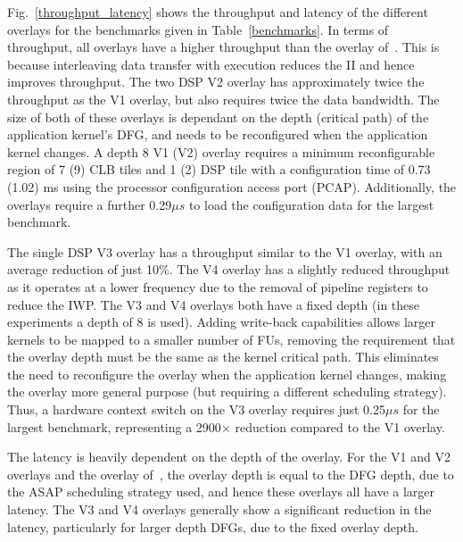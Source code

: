 




Fig.~\ref{throughput_latency} shows the throughput and latency of the different overlays for the benchmarks given in Table~\ref{benchmarks}. 
In terms of throughput, all overlays have a higher throughput than the overlay of~\cite{li2016area}. This is because interleaving data transfer with execution reduces the II and hence improves throughput.
The two DSP V2 overlay has approximately twice the throughput as the V1 overlay, but also requires twice the data bandwidth. The size of both of these overlays is dependant on the depth (critical path) of the application kernel's DFG, and needs to be reconfigured when the application kernel changes.
A depth 8 V1 (V2) overlay requires a minimum reconfigurable region of 7 (9) CLB tiles and 1 (2) DSP tile with a configuration time of 0.73 (1.02) ms using the processor configuration access port (PCAP). Additionally, the overlays require a further 0.29$\mu s$ to load the configuration data for the largest benchmark.

The single DSP V3 overlay has a throughput similar to the V1 overlay, with an average reduction of just 10\%. The V4 overlay has a slightly reduced throughput as it operates at a lower frequency due to the removal of pipeline registers to reduce the IWP.
The V3 and V4 overlays both have a fixed depth (in these experiments a depth of 8 is used).
Adding write-back capabilities allows larger kernels to be mapped to a smaller number of FUs, removing the requirement that the overlay depth must be the same as the kernel critical path. This eliminates the need to reconfigure the overlay when the application kernel changes, making the overlay more general purpose (but requiring a different scheduling strategy).
Thus, a hardware context switch on the V3 overlay requires just 0.25$\mu s$ for the largest benchmark, representing a 2900$\times$ reduction compared to the V1 overlay.

The latency is heavily dependent on the depth of the overlay. For the V1 and V2 overlays and the overlay of~\cite{li2016area}, the overlay depth is equal to the DFG depth, due to the ASAP scheduling strategy used, and hence these overlays all have a larger latency. The V3 and V4 overlays generally show a significant reduction in the latency, particularly for larger depth DFGs, due to the fixed overlay depth. 





